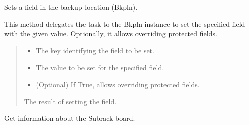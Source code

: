 \documentclass[letterpaper,10pt,english]{sphinxmanual}
\begin{document}
\begin{fulllineitems}
\begin{fulllineitems}
\label{\detokenize{apidocs:subrack_management_board.SubrackMngBoard.bkpln_set_field}}
\pysigstartsignatures
{}
\pysigstopsignatures
\sphinxAtStartPar
Sets a field in the backup location (Bkpln).

\sphinxAtStartPar
This method delegates the task to the Bkpln instance to set the specified
field with the given value. Optionally, it allows overriding protected fields.
\begin{quote}\begin{description}
\begin{itemize}
\item {} 
\sphinxAtStartPar
{} \textendash{} The key identifying the field to be set.

\item {} 
\sphinxAtStartPar
{} \textendash{} The value to be set for the specified field.

\item {} 
\sphinxAtStartPar
{} \textendash{} (Optional) If True, allows overriding protected fields.

\end{itemize}

\sphinxAtStartPar
The result of setting the field.

\end{description}\end{quote}

\end{fulllineitems}


\begin{fulllineitems}
\label{\detokenize{apidocs:subrack_management_board.SubrackMngBoard.get_board_info}}
\pysigstartsignatures
{}
\pysigstopsignatures
\sphinxAtStartPar
Get information about the Subrack board.


\end{fulllineitems}
\end{fulllineitems}
\end{document}
